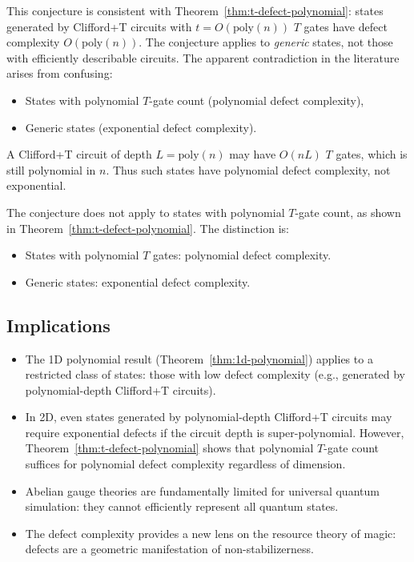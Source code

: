 \begin{remark}
This conjecture is consistent with Theorem~\ref{thm:t-defect-polynomial}: states generated by Clifford+T circuits with $t = O(\text{poly}(n))$ $T$ gates have defect complexity $O(\text{poly}(n))$. The conjecture applies to \textit{generic} states, not those with efficiently describable circuits. The apparent contradiction in the literature arises from confusing:
\begin{itemize}
    \item States with polynomial $T$-gate count (polynomial defect complexity),
    \item Generic states (exponential defect complexity).
\end{itemize}
A Clifford+T circuit of depth $L = \text{poly}(n)$ may have $O(nL)$ $T$ gates, which is still polynomial in $n$. Thus such states have polynomial defect complexity, not exponential.
\end{remark}

\begin{remark}
The conjecture does not apply to states with polynomial $T$-gate count, as shown in Theorem~\ref{thm:t-defect-polynomial}. The distinction is:
\begin{itemize}
    \item States with polynomial $T$ gates: polynomial defect complexity.
    \item Generic states: exponential defect complexity.
\end{itemize}
\end{remark}

\subsection{Implications}

\begin{itemize}
    \item The 1D polynomial result (Theorem~\ref{thm:1d-polynomial}) applies to a restricted class of states: those with low defect complexity (e.g., generated by polynomial-depth Clifford+T circuits).
    \item In 2D, even states generated by polynomial-depth Clifford+T circuits may require exponential defects if the circuit depth is super-polynomial. However, Theorem~\ref{thm:t-defect-polynomial} shows that polynomial $T$-gate count suffices for polynomial defect complexity regardless of dimension.
    \item Abelian gauge theories are fundamentally limited for universal quantum simulation: they cannot efficiently represent all quantum states.
    \item The defect complexity provides a new lens on the resource theory of magic: defects are a geometric manifestation of non-stabilizerness.
\end{itemize}

